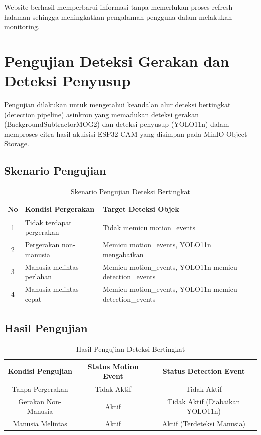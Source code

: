Website berhasil memperbarui informasi tanpa memerlukan proses refresh halaman sehingga meningkatkan pengalaman pengguna dalam melakukan monitoring.

\section{Pengujian Deteksi Gerakan dan Deteksi Penyusup}

Pengujian dilakukan untuk mengetahui keandalan alur deteksi bertingkat (detection pipeline) asinkron yang memadukan deteksi gerakan (BackgroundSubtractorMOG2) dan deteksi penyusup (YOLO11n) dalam memproses citra hasil akuisisi ESP32-CAM yang disimpan pada MinIO Object Storage.

\subsection{Skenario Pengujian}

\begin{table}[H]
	\centering
	\caption{Skenario Pengujian Deteksi Bertingkat}
	\begin{tabular}{|c|l|l|}
		\hline
		No & Kondisi Pergerakan & Target Deteksi Objek \\
		\hline
		1 & Tidak terdapat pergerakan & Tidak memicu motion\_events \\
		2 & Pergerakan non-manusia & Memicu motion\_events, YOLO11n mengabaikan \\
		3 & Manusia melintas perlahan & Memicu motion\_events, YOLO11n memicu detection\_events \\
		4 & Manusia melintas cepat & Memicu motion\_events, YOLO11n memicu detection\_events \\
		\hline
	\end{tabular}
\end{table}

\subsection{Hasil Pengujian}

\begin{table}[H]
	\centering
	\caption{Hasil Pengujian Deteksi Bertingkat}
	\begin{tabular}{|c|c|c|}
		\hline
		Kondisi Pengujian & Status Motion Event & Status Detection Event \\
		\hline
		Tanpa Pergerakan & Tidak Aktif & Tidak Aktif \\
		Gerakan Non-Manusia & Aktif & Tidak Aktif (Diabaikan YOLO11n) \\
		Manusia Melintas & Aktif & Aktif (Terdeteksi Manusia) \\
		\hline
	\end{tabular}
\end{table}

